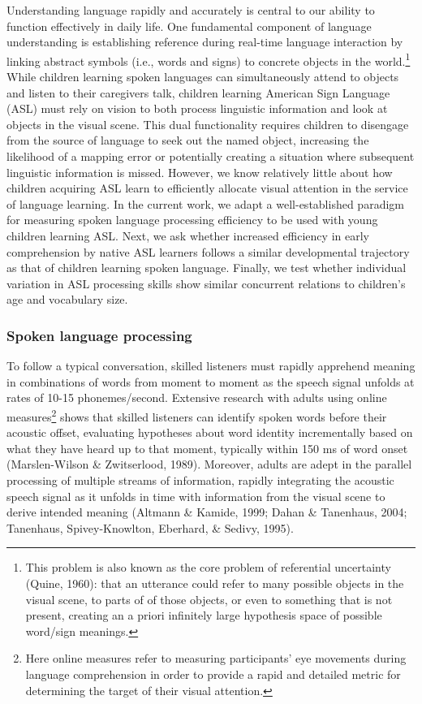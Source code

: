 \documentclass[12pt,]{article}
\let\rmarkdownfootnote\footnote%
\def\footnote{\protect\rmarkdownfootnote}
\begin{document}
Understanding language rapidly and accurately is central to our ability
to function effectively in daily life. One fundamental component of
language understanding is establishing reference during real-time
language interaction by linking abstract symbols (i.e., words and signs)
to concrete objects in the world.\footnote{This problem is also known as
  the core problem of referential uncertainty (Quine, 1960): that an
  utterance could refer to many possible objects in the visual scene, to
  parts of of those objects, or even to something that is not present,
  creating an a priori infinitely large hypothesis space of possible
  word/sign meanings.} While children learning spoken languages can
simultaneously attend to objects and listen to their caregivers talk,
children learning American Sign Language (ASL) must rely on vision to
both process linguistic information and look at objects in the visual
scene. This dual functionality requires children to disengage from the
source of language to seek out the named object, increasing the
likelihood of a mapping error or potentially creating a situation where
subsequent linguistic information is missed. However, we know relatively
little about how children acquiring ASL learn to efficiently allocate
visual attention in the service of language learning. In the current
work, we adapt a well-established paradigm for measuring spoken language
processing efficiency to be used with young children learning ASL. Next,
we ask whether increased efficiency in early comprehension by native ASL
learners follows a similar developmental trajectory as that of children
learning spoken language. Finally, we test whether individual variation
in ASL processing skills show similar concurrent relations to children's
age and vocabulary size.

\subsubsection{Spoken language
processing}\label{spoken-language-processing}

To follow a typical conversation, skilled listeners must rapidly
apprehend meaning in combinations of words from moment to moment as the
speech signal unfolds at rates of 10-15 phonemes/second. Extensive
research with adults using online measures\footnote{Here online measures
  refer to measuring participants' eye movements during language
  comprehension in order to provide a rapid and detailed metric for
  determining the target of their visual attention.} shows that skilled
listeners can identify spoken words before their acoustic offset,
evaluating hypotheses about word identity incrementally based on what
they have heard up to that moment, typically within 150 ms of word onset
(Marslen-Wilson \& Zwitserlood, 1989). Moreover, adults are adept in the
parallel processing of multiple streams of information, rapidly
integrating the acoustic speech signal as it unfolds in time with
information from the visual scene to derive intended meaning (Altmann \&
Kamide, 1999; Dahan \& Tanenhaus, 2004; Tanenhaus, Spivey-Knowlton,
Eberhard, \& Sedivy, 1995).
\end{document}
